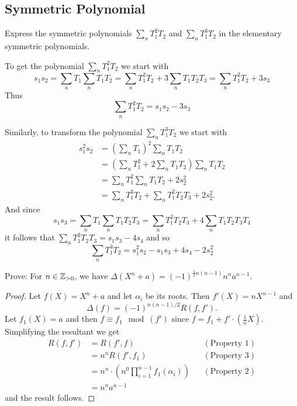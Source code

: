 
\subsection{Symmetric Polynomial}
    \begin{ex}{14.10}
        Express the symmetric polynomials $\sum_n T_1^2T_2$ and $\sum_{n} T_1^3T_2$ in the elementary symmetric polynomials.
    \end{ex}
    \begin{sol}
        To get the polynomial $\sum_n T_1^2T_2$ we start with
        $$
            s_1s_2=\sum_n T_1\sum_n T_1T_2 = \sum_n T_1^2T_2+3\sum_n T_1T_2T_3 = \sum_n T_1^2T_2+3s_3
        $$
        Thus 
        $$
            \sum_n T_1^2T_2 = s_1s_2-3s_3
        $$

        Similarly, to transform the polynomial $\sum_{n} T_1^3T_2$ we start with
        \begin{align*}
            s_1^2s_2&=\left(\sum_nT_1\right)^2\sum_nT_1T_2\\
            &=\left(\sum_n T_1^2+2\sum_n T_1T_2\right)\sum_nT_1T_2\\
            &=\sum_nT_1^2\sum_n T_1T_2+2s_2^2\\
            &=\sum_nT_1^3T_2+\sum_n T_1^2T_2T_3+2s_2^2.
        \end{align*}
        And since
        $$
            s_1s_3=\sum_nT_1\sum_nT_1T_2T_3=\sum_nT_1^2T_2T_3+4\sum_n T_1T_2T_3T_4
        $$
        it follows that $\sum_n T_1^2T_2T_3=s_1s_3-4s_4$ and so
        $$
            \sum_{n} T_1^3T_2=s_1^2s_2-s_1s_3+4s_4-2s_2^2
        $$
    \end{sol}

    \begin{ex}{14.14}
        Prove: For $n\in\mathbb{Z}_{>0}$, we have $\Delta(X^n+a)=(-1)^{\frac12n(n-1)}n^na^{n-1}$.
    \end{ex}
    \begin{proof}
        Let $f(X)=X^n+a$ and let $\alpha_i$ be its roots. Then $f'(X)=nX^{n-1}$ and
        $$
            \Delta(f)=(-1)^{n(n-1)/2}R(f,f').
        $$
        Let $f_1(X)=a$ and then $f\equiv f_1\mod(f')$ since $f = f_1+f'\cdot\left(\frac1n X\right)$.
        Simplifying the resultant we get
        \begin{align*}
            R(f,f')&=R(f',f)&&(\text{Property }1)\\
            &=n^{n}R(f',f_1)&&(\text{Property }3)\\
            &=n^{n}\cdot\left(n^0\prod_{i=1}^{n-1}f_1(\alpha_i)\right)&&(\text{Property }2)\\
            &=n^n a^{n-1}
        \end{align*}
        and the result follows.
    \end{proof}

